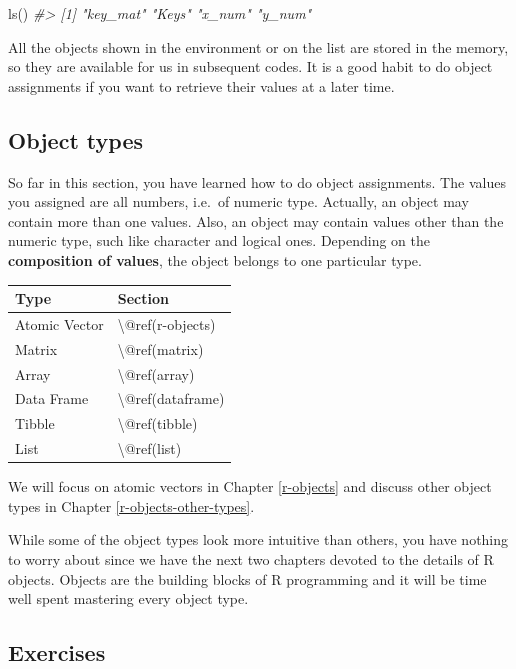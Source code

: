 \documentclass[
]{book}
\newenvironment{Shaded}{\begin{snugshade}}{\end{snugshade}}
\newcommand{\CommentTok}[1]{\textcolor[rgb]{0.56,0.35,0.01}{\textit{#1}}}
\newcommand{\FunctionTok}[1]{\textcolor[rgb]{0.00,0.00,0.00}{#1}}
\newcommand{\NormalTok}[1]{#1}
\begin{document}
\begin{Shaded}
\begin{Highlighting}[]
\FunctionTok{ls}\NormalTok{()}
\CommentTok{\#\textgreater{} [1] "key\_mat" "Keys"    "x\_num"   "y\_num"}
\end{Highlighting}
\end{Shaded}

All the objects shown in the environment or on the list are stored in the memory, so they are available for us in subsequent codes. It is a good habit to do object assignments if you want to retrieve their values at a later time.

\hypertarget{object-types}{%
\subsection{Object types}\label{object-types}}

So far in this section, you have learned how to do object assignments. The values you assigned are all numbers, i.e.~of numeric type. Actually, an object may contain more than one values. Also, an object may contain values other than the numeric type, such like character and logical ones. Depending on the \textbf{composition of values}, the object belongs to one particular type.

\begin{tabular}{l|l}
\hline
Type & Section\\
\hline
Atomic Vector & \textbackslash{}@ref(r-objects)\\
\hline
Matrix & \textbackslash{}@ref(matrix)\\
\hline
Array & \textbackslash{}@ref(array)\\
\hline
Data Frame & \textbackslash{}@ref(dataframe)\\
\hline
Tibble & \textbackslash{}@ref(tibble)\\
\hline
List & \textbackslash{}@ref(list)\\
\hline
\end{tabular}

We will focus on atomic vectors in Chapter \ref{r-objects} and discuss other object types in Chapter \ref{r-objects-other-types}.

While some of the object types look more intuitive than others, you have nothing to worry about since we have the next two chapters devoted to the details of R objects. Objects are the building blocks of R programming and it will be time well spent mastering every object type.

\hypertarget{exercises-2}{%
\subsection{Exercises}\label{exercises-2}}
\end{document}
